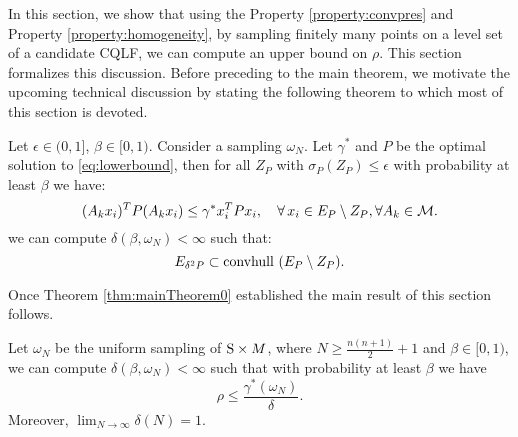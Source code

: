 In this section, we show that using the Property \ref{property:convpres} and Property \ref{property:homogeneity}, by sampling finitely many points on a level set of a candidate CQLF, we can compute an upper bound on $\rho$. This section formalizes this discussion. Before preceding to the main theorem, we motivate the upcoming technical discussion by stating the following theorem to which most of this section is devoted.

\begin{theorem} \label{thm:mainTheorem0} Let $\epsilon \in (0,1]$, $\beta \in [0,1)$. Consider a sampling $\omega_N$. Let $\gamma^*$ and $P$ be the optimal solution to \eqref{eq:lowerbound}, then for all $Z_P$ with $\sigma_P(Z_P)\leq \epsilon$ with probability at least $\beta$ we have:
\begin{equation*} (A_kx_i)^TP(A_kx_i)\leq \gamma^*x_i^TPx_i, \quad \forall\, x_i \in E_P \setminus Z_P, \forall A_k \in \mathcal{M}.\end{equation*}
we can compute $\delta(\beta, \omega_N) < \infty$ such that:
\begin{equation}\label{eqn:contraction}E_{\delta^2P} \subset  \mbox{convhull } (E_P \setminus Z_P).
\end{equation}
\end{theorem}

Once Theorem \ref{thm:mainTheorem0} established the main result of this section follows.

\begin{theorem} \label{thm:mainTheorem} Let $\omega_N$ be the uniform sampling of $\text{S} \times M$, where $N \geq \frac{n(n+1)}{2}+1$ and $\beta \in [0,1)$, we can compute $\delta(\beta, \omega_N) < \infty$ such that with probability at least $\beta$ we have $$\rho \leq \frac{\gamma^*(\omega_N)}{\delta}.$$ Moreover, $\lim_{N \to \infty} \delta(N) = 1$.
\end{theorem}

